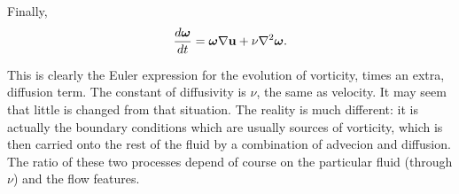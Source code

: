 Finally,
\begin{equation*}
  \frac{d \bm{\omega} }{d t}
  =
  \bm{\omega}\nabla\mathbf{u}
  +\nu  \nabla^2\bm{\omega} .
\end{equation*}

This is clearly the Euler expression for the evolution of vorticity,
times an extra, diffusion term. The constant of diffusivity is $\nu$,
the same as velocity. It may seem that little is changed from that
situation. The reality is much different: it is actually the boundary
conditions which are usually sources of vorticity, which is then
carried onto the rest of the fluid by a combination of advecion and
diffusion. The ratio of these two processes depend of course on the
particular fluid (through $\nu$) and the flow features.
